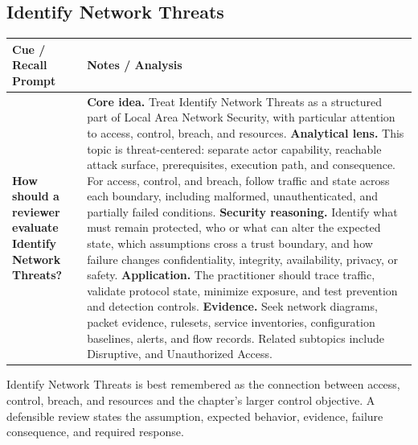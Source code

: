 \documentclass[11pt]{article}
\newcommand{\CornellHeader}{%
\rowcolor{Navy}\color{white}\bfseries Cue / Recall Prompt & \color{white}\bfseries Notes / Analysis\\\hline}
\newcommand{\CornellRow}[2]{%
\cellcolor{CueGray}\RaggedRight\textbf{#1} & \RaggedRight #2\\\hline}
\begin{document}
\subsection*{Identify Network Threats}
\begin{longtable}{>{\RaggedRight\arraybackslash}p{}|>{\RaggedRight\arraybackslash}p{}}
\CornellHeader
\CornellRow{How should a reviewer evaluate Identify Network Threats?}{\textbf{Core idea.} Treat Identify Network Threats as a structured part of Local Area Network Security, with particular attention to access, control, breach, and resources. \textbf{Analytical lens.} This topic is threat-centered: separate actor capability, reachable attack surface, prerequisites, execution path, and consequence. For access, control, and breach, follow traffic and state across each boundary, including malformed, unauthenticated, and partially failed conditions. \textbf{Security reasoning.} Identify what must remain protected, who or what can alter the expected state, which assumptions cross a trust boundary, and how failure changes confidentiality, integrity, availability, privacy, or safety. \textbf{Application.} The practitioner should trace traffic, validate protocol state, minimize exposure, and test prevention and detection controls. \textbf{Evidence.} Seek network diagrams, packet evidence, rulesets, service inventories, configuration baselines, alerts, and flow records. Related subtopics include Disruptive, and Unauthorized Access.}
\end{longtable}
\begin{topicsummary}
Identify Network Threats is best remembered as the connection between access, control, breach, and resources and the chapter's larger control objective. A defensible review states the assumption, expected behavior, evidence, failure consequence, and required response.
\end{topicsummary}
\end{document}

